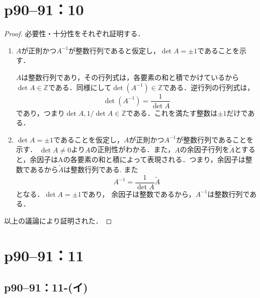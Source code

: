 \documentclass[a4paper,10pt,fleqn]{ltjsarticle}
\begin{document}
\section*{p90--91：10}

\begin{leftbar}
    \begin{proof}
        必要性・十分性をそれぞれ証明する．
        \begin{enumerate}
            \item $A$が正則かつ$A^{-1}$が整数行列であると仮定し，$\det A=\pm 1$であることを示す．

                  $A$は整数行列であり，その行列式は，各要素の和と積でかけているから$\det A \in \mathbb{Z}$である．同様にして$\det (A^{-1}) \in \mathbb{Z}$である．逆行列の行列式は，
                  \[
                      \det (A^{-1})=\frac{1}{\det A}
                  \]
                  であり，つまり$\det A,1/\det A \in \mathbb{Z}$である．これを満たす整数は$\pm 1$だけである．
            \item $\det A=\pm 1$であることを仮定し，$A$が正則かつ$A^{-1}$が整数行列であることを示す．
                  $\det A \neq 0$より$A$の正則性がわかる．また，$A$の余因子行列を$\tilde{A}$とすると，余因子はAの各要素の和と積によって表現される．つまり，余因子は整数であるから$\tilde{A}$は整数行列である. また
                  \[
                      A^{-1}=\frac{1}{\det A}\tilde{A}
                  \]
                  となる．$\det A=\pm 1$であり， 余因子は整数であるから，$A^{-1}$は整数行列である．
        \end{enumerate}
        以上の議論により証明された．
    \end{proof}
\end{leftbar}

\newpage

\section*{p90--91：11}

\subsection*{p90--91：11-(イ)}
\end{document}
